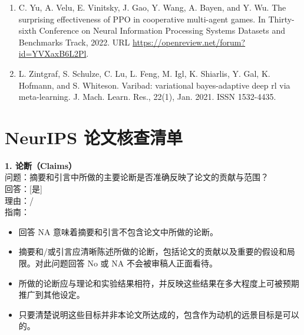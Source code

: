 \documentclass[11pt,UTF8,fontset=fandol]{ctexart}
\begin{document}
\begin{enumerate}[leftmargin=2em,itemsep=2pt]
\item C. Yu, A. Velu, E. Vinitsky, J. Gao, Y. Wang, A. Bayen, and Y. Wu. The surprising effectiveness of PPO in cooperative multi-agent games. In Thirty-sixth Conference on Neural Information Processing Systems Datasets and Benchmarks Track, 2022. URL \url{https://openreview.net/forum?id=YVXaxB6L2Pl}.
\item L. Zintgraf, S. Schulze, C. Lu, L. Feng, M. Igl, K. Shiarlis, Y. Gal, K. Hofmann, and S. Whiteson. Varibad: variational bayes-adaptive deep rl via meta-learning. J. Mach. Learn. Res., 22(1), Jan. 2021. ISSN 1532-4435.
\end{enumerate}

\section*{NeurIPS 论文核查清单}

\textbf{1. 论断（Claims）}\\
问题：摘要和引言中所做的主要论断是否准确反映了论文的贡献与范围？\\
回答：[是]\\
理由：/\\
指南：
\begin{itemize}[leftmargin=1.5em,itemsep=1pt]
\item 回答 NA 意味着摘要和引言不包含论文中所做的论断。
\item 摘要和/或引言应清晰陈述所做的论断，包括论文的贡献以及重要的假设和局限。对此问题回答 No 或 NA 不会被审稿人正面看待。
\item 所做的论断应与理论和实验结果相符，并反映这些结果在多大程度上可被预期推广到其他设定。
\item 只要清楚说明这些目标并非本论文所达成的，包含作为动机的远景目标是可以的。
\end{itemize}
\end{document}
